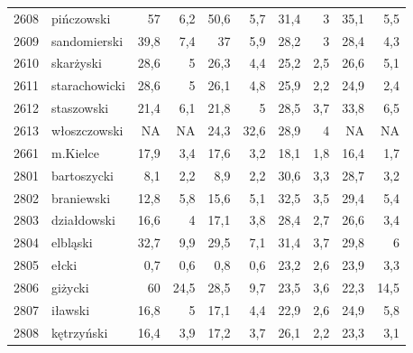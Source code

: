 \begin{center}
\begin{longtable}{lp{3cm}rrrrrrrr}
2608 & pińczowski              & 57      & 6,2         & 50,6     & 5,7          & 31,4     & 3            & 35,1     & 5,5          \\
2609 & sandomierski            & 39,8    & 7,4         & 37       & 5,9          & 28,2     & 3            & 28,4     & 4,3          \\
2610 & skarżyski               & 28,6    & 5           & 26,3     & 4,4          & 25,2     & 2,5          & 26,6     & 5,1          \\
2611 & starachowicki           & 28,6    & 5           & 26,1     & 4,8          & 25,9     & 2,2          & 24,9     & 2,4          \\
2612 & staszowski              & 21,4    & 6,1         & 21,8     & 5            & 28,5     & 3,7          & 33,8     & 6,5          \\
2613 & włoszczowski            & NA      & NA          & 24,3     & 32,6         & 28,9     & 4            & NA       & NA           \\
2661 & m.Kielce                & 17,9    & 3,4         & 17,6     & 3,2          & 18,1     & 1,8          & 16,4     & 1,7          \\
2801 & bartoszycki             & 8,1     & 2,2         & 8,9      & 2,2          & 30,6     & 3,3          & 28,7     & 3,2          \\
2802 & braniewski              & 12,8    & 5,8         & 15,6     & 5,1          & 32,5     & 3,5          & 29,4     & 5,4          \\
2803 & działdowski             & 16,6    & 4           & 17,1     & 3,8          & 28,4     & 2,7          & 26,6     & 3,4          \\
2804 & elbląski                & 32,7    & 9,9         & 29,5     & 7,1          & 31,4     & 3,7          & 29,8     & 6            \\
2805 & ełcki                   & 0,7     & 0,6         & 0,8      & 0,6          & 23,2     & 2,6          & 23,9     & 3,3          \\
2806 & giżycki                 & 60      & 24,5        & 28,5     & 9,7          & 23,5     & 3,6          & 22,3     & 14,5         \\
2807 & iławski                 & 16,8    & 5           & 17,1     & 4,4          & 22,9     & 2,6          & 24,9     & 5,8          \\
2808 & kętrzyński              & 16,4    & 3,9         & 17,2     & 3,7          & 26,1     & 2,2          & 23,3     & 3,1          \\

\end{longtable}
\end{center}
